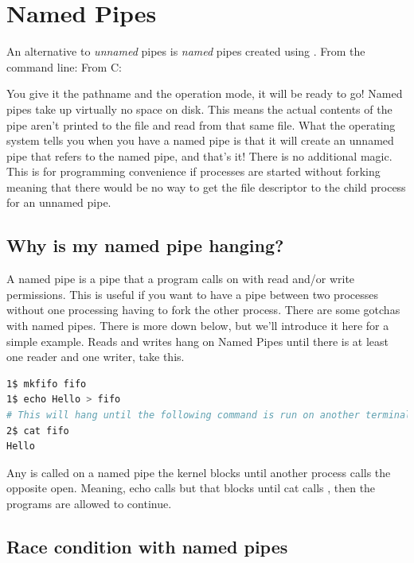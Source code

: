 \section{Named Pipes}

An alternative to \emph{unnamed} pipes is \emph{named} pipes created using .
From the command line:  From C: 

You give it the pathname and the operation mode, it will be ready to go!
Named pipes take up virtually no space on disk.
This means the actual contents of the pipe aren't printed to the file and read from that same file.
What the operating system tells you when you have a named pipe is that it will create an unnamed pipe that refers to the named pipe, and that's it!
There is no additional magic.
This is for programming convenience if processes are started without forking meaning that there would be no way to get the file descriptor to the child process for an unnamed pipe.

\subsection{Why is my named pipe hanging?}

A named pipe  is a pipe that a program calls  on with read and/or write permissions.
This is useful if you want to have a pipe between two processes without one processing having to fork the other process.
There are some gotchas with named pipes.
There is more down below, but we'll introduce it here for a simple example.
Reads and writes hang on Named Pipes until there is at least one reader and one writer, take this.

\begin{lstlisting}[language=bash]
1$ mkfifo fifo
1$ echo Hello > fifo
# This will hang until the following command is run on another terminal or another process
2$ cat fifo
Hello
\end{lstlisting}

Any  is called on a named pipe the kernel blocks until another process calls the opposite open. Meaning, echo calls  but that blocks until cat calls , then the programs are allowed to continue.

\subsection{Race condition with named pipes}

